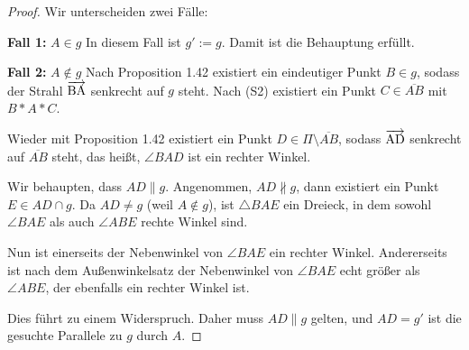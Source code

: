 \documentclass[a4paper,12pt]{article}
\theoremstyle{break}
\begin{document}
\begin{proof}
Wir unterscheiden zwei Fälle:

\textbf{Fall 1:} \(A \in g\)  
In diesem Fall ist \(g' := g\). Damit ist die Behauptung erfüllt.

\textbf{Fall 2:} \(A \notin g\)  
Nach Proposition 1.42 existiert ein eindeutiger Punkt \(B \in g\), sodass der Strahl \(\overrightarrow{\rm BA}\) senkrecht auf \(g\) steht. Nach (S2) existiert ein Punkt \(C \in \overline{AB}\) mit \(B * A * C\).  

Wieder mit Proposition 1.42 existiert ein Punkt \(D \in \Pi \setminus \overline{AB}\), sodass \(\overrightarrow{\rm AD}\) senkrecht auf \(\overline{AB}\) steht, das heißt, \(\angle BAD\) ist ein rechter Winkel.  

Wir behaupten, dass \(AD \parallel g\). Angenommen, \(AD \not\parallel g\), dann existiert ein Punkt \(E \in AD \cap g\). Da \(AD \neq g\) (weil \(A \notin g\)), ist \(\triangle BAE\) ein Dreieck, in dem sowohl \(\angle BAE\) als auch \(\angle ABE\) rechte Winkel sind.  

Nun ist einerseits der Nebenwinkel von \(\angle BAE\) ein rechter Winkel. Andererseits ist nach dem Außenwinkelsatz der Nebenwinkel von \(\angle BAE\) echt größer als \(\angle ABE\), der ebenfalls ein rechter Winkel ist.  

Dies führt zu einem Widerspruch. Daher muss \(AD \parallel g\) gelten, und \(AD = g'\) ist die gesuchte Parallele zu \(g\) durch \(A\).
\end{proof}
\end{document}
